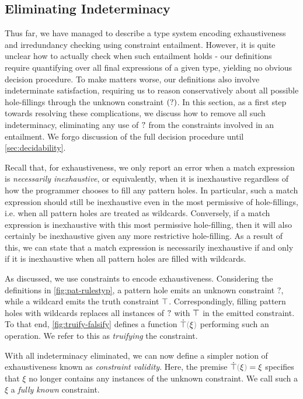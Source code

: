 \subsection{Eliminating Indeterminacy}\label{sec:analyses}
Thus far, we have managed to describe a type system encoding exhaustiveness and irredundancy checking using constraint entailment. However, it is quite unclear how to actually check when such entailment holds - our definitions require quantifying over all final expressions of a given type, yielding no obvious decision procedure. To make matters worse, our definitions also involve indeterminate satisfaction, requiring us to reason conservatively about all possible hole-fillings through the unknown constraint $(\mathtt{?})$. In this section, as a first step towards resolving these complications, we discuss how to remove all such indeterminacy, eliminating any use of $\mathtt{?}$ from the constraints involved in an entailment. We forgo discussion of the full decision procedure until \autoref{sec:decidability}.

Recall that, for exhaustiveness, we only report an error when a  match expression is \emph{necessarily inexhaustive}, or equivalently, when it is inexhaustive regardless of how the programmer chooses to fill any pattern holes. In particular, such a match expression should still be inexhaustive even in the most permissive of hole-fillings, i.e. when all pattern holes are treated as wildcards. Conversely, if a match expression is inexhaustive with this most permissive hole-filling, then it will also certainly be inexhaustive given any more restrictive hole-filling. As a result of this, we can state that a match expression is necessarily inexhaustive if and only if it is inexhaustive when all pattern holes are filled with wildcards. 

As discussed, we use constraints to encode exhaustiveness. Considering the definitions in \autoref{fig:pat-rulestyp}, a pattern hole emits an unknown constraint $?$, while a wildcard emits the truth constraint $\top$. Correspondingly, filling pattern holes with wildcards replaces all instances of $\mathtt{?}$ with $\top$ in the emitted constraint. To that end, \autoref{fig:truify-falsify} defines a function $\ctruify{\xi}$ performing such an operation. We refer to this as \emph{truifying} the constraint. 

With all indeterminacy eliminated, we can now define a simpler notion of exhaustiveness known as \emph{constraint validity}. Here, the premise $\ctruify{\xi} = \xi$ specifies that $\xi$ no longer contains any instances of the unknown constraint. We call such a $\xi$ a \emph{fully known} constraint.

